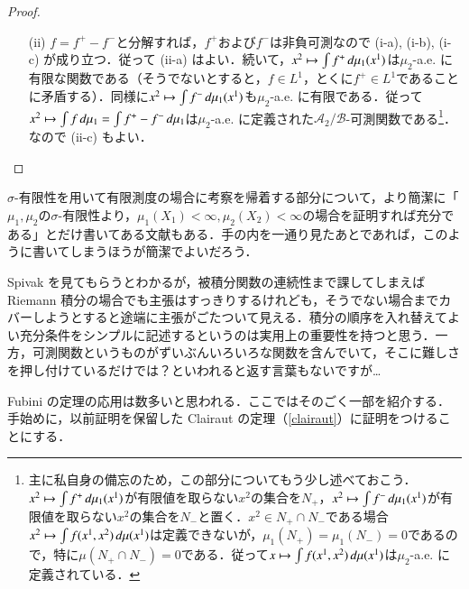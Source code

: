 \begin{proof}
\begin{enumerate}
\begin{itemize}
\end{itemize}
\item[(ii)] $f=f^+ - f^-$と分解すれば，$f^+$および$f^-$は非負可測なので (i-a), (i-b), (i-c) が成り立つ．従って (ii-a) はよい．続いて，$x^2 \mapsto \int f^+ \mathop{}\!d\mu_1(x^1)$は$\mu_2$-a.e. に有限な関数である（そうでないとすると，$f \in L^1$，とくに$f^+ \in L^1$であることに矛盾する）．同様に$x^2 \mapsto \int f^- \mathop{}\!d\mu_1(x^1)$も$\mu_2$-a.e. に有限である．従って$x^2 \mapsto \int f \mathop{}\!d\mu_1 = \int f^+ - f^- \mathop{}\!d\mu_1$は$\mu_2$-a.e. に定義された$\mathcal{A}_2/\mathcal{B}$-可測関数である\footnote{主に私自身の備忘のため，この部分についてもう少し述べておこう．$x^2 \mapsto \int f^+ \mathop{}\!d\mu_1(x^1)$が有限値を取らない$x^2$の集合を$N_+$，$x^2 \mapsto \int f^- \mathop{}\!d\mu_1(x^1)$が有限値を取らない$x^2$の集合を$N_-$と置く．$x^2 \in N_+ \cap N_-$である場合$x^2 \mapsto \int f(x^1, x^2) \mathop{}\!d\mu(x^1)$は定義できないが，$\mu_1(N_+)= \mu_1(N_-)=0$であるので，特に$\mu(N_+ \cap N_-)=0$である．従って$x \mapsto \int f(x^1, x^2) \mathop{}\!d\mu(x^1)$は$\mu_2$-a.e. に定義されている．}．なので (ii-c) もよい．
\end{enumerate}
\end{proof}

\begin{dig}
$\sigma$-有限性を用いて有限測度の場合に考察を帰着する部分について，より簡潔に「$\mu_1, \mu_2$の$\sigma$-有限性より，$\mu_1(X_1)< \infty, \mu_2(X_2)<\infty$の場合を証明すれば充分である」とだけ書いてある文献もある．手の内を一通り見たあとであれば，このように書いてしまうほうが簡潔でよいだろう．
\end{dig}

\begin{dig}Spivak を見てもらうとわかるが，被積分関数の連続性まで課してしまえば Riemann 積分の場合でも主張はすっきりするけれども，そうでない場合までカバーしようとすると途端に主張がごたついて見える．積分の順序を入れ替えてよい充分条件をシンプルに記述するというのは実用上の重要性を持つと思う．一方，可測関数というものがずいぶんいろいろな関数を含んでいて，そこに難しさを押し付けているだけでは？といわれると返す言葉もないですが…
\end{dig}

Fubini の定理の応用は数多いと思われる．ここではそのごく一部を紹介する．手始めに，以前証明を保留した Clairaut の定理（\cref{clairaut}）に証明をつけることにする．

\clairaut*

